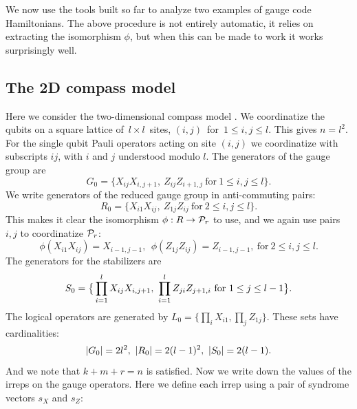 We now use the tools built so far
to analyze two examples of gauge code Hamiltonians.
The above procedure is not entirely automatic,
it relies on extracting the isomorphism $\phi$,
but when this can be made to work it works surprisingly well.

%
%

\subsection{The 2D compass model}

Here we consider the two-dimensional compass model \cite{Bacon2006}.
We coordinatize the qubits on a square 
lattice of\ $l\times l$\ sites,
$(i, j)$\ for\ $1\le i, j\le l.$
This gives $n = l^2.$
For the single qubit Pauli operators acting on site
$(i, j)$ we coordinatize with subscripts $ij$, 
with $i$ and $j$ understood modulo $l$.
The generators of the gauge group are
$$
    G_0 = \big\{ X_{ij}X_{i,j+1},\ Z_{ij}Z_{i+1,j}\ \mbox{for}\ 1\le i, j\le l\big\}.
$$
We write generators of the reduced
gauge group in anti-commuting pairs:
$$
    R_0 = \big\{ X_{i1}X_{ij},\ Z_{1j}Z_{ij}\ \mbox{for}\ 2\le i, j\le l\big\}.
$$
This makes it clear the isomorphism $\phi : R \to \mathcal{P}_r$ to use,
and we again use pairs $i,j$ to coordinatize $\mathcal{P}_r$:
$$
    \phi(X_{i1}X_{ij}) = X_{i-1,j-1}, \ \ \phi(Z_{1j}Z_{ij}) = Z_{i-1,j-1},\ \mbox{for}\ 2\le i, j\le l.
$$
The generators for the stabilizers are
$$
    \Stab_0 = \big\{ \prod_{i=1}^l X_{ij}X_{i,j+1},\ \prod_{i=1}^l Z_{ji}Z_{j+1,i}\ \mbox{for}\ 1\le j\le l-1\big\}.
$$
The logical operators are generated by $L_0 = \big\{ \prod_i X_{i1}, \prod_j Z_{1j} \}.$
These sets have cardinalities:
$$|G_0|=2l^2,\ |R_0| = 2(l-1)^2,\ |\Stab_0| = 2(l-1).$$
And we note that $k+m+r=n$ is satisfied.
Now we write down the values of the
irreps on the gauge operators.
Here we define each irrep using a pair 
of syndrome vectors $s_X$ and $s_Z:$
